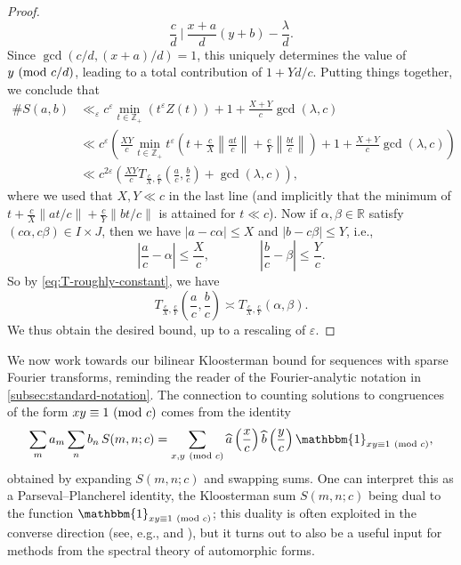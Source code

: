 \documentclass[reqno,11pt]{amsart}
\theoremstyle{remark}
\numberwithin{equation}{section}
\newcommand{\Z}{\mathbb{Z}}
\newcommand{\R}{\mathbb{R}}
\newcommand{\one}{\mathbbm{1}}
\newcommand{\eps}{\varepsilon}
\renewcommand{\hat}{\widehat}
\renewcommand{\pmod}[1]{\ (\textnormal{mod } #1)}
\begin{document}
\begin{proof}
\[
    \frac{c}{d}\ \bigg\vert \ \frac{x+a}{d} (y+b) - \frac{\lambda}{d}.
\]
Since $\gcd(c/d, (x+a)/d) = 1$, this uniquely determines the value of $y \pmod{c/d}$, leading to a total contribution of $1 + Yd/c$. Putting things together, we conclude that
\[
\begin{aligned}
    \# S(a, b) 
    &\ll_\eps 
    c^\eps \min_{t \in \Z_+} \left(t^\eps Z(t) \right) + 1 + \frac{X+Y}{c} \gcd(\lambda, c)
    \\
    &\ll
    c^\eps \left(\frac{XY}{c} \min_{t \in \Z_+} t^\eps \left(t + \frac{c}{X}\left\| \frac{at}{c}\right\| + \frac{c}{Y}\left\| \frac{bt}{c}\right\|\right) + 1 + \frac{X+Y}{c} \gcd(\lambda, c) \right)
    \\
    &\ll 
    c^{2\eps} \left(\frac{XY}{c} T_{\frac{c}{X},\frac{c}{Y}} \left(\frac{a}{c}, \frac{b}{c}\right) + \gcd(\lambda, c)\right),
\end{aligned}
\]
where we used that $X, Y \ll c$ in the last line (and implicitly that the minimum of $t + \frac{c}{X} \|at/c\| + \frac{c}{Y} \|bt/c\|$ is attained for $t \ll c$). Now if $\alpha, \beta \in \R$ satisfy $(c\alpha, c\beta) \in I \times J$, then we have $|a - c\alpha| \le X$ and $|b - c\beta| \le Y$, i.e.,
\[
    \left\vert\frac{a}{c} - \alpha \right\vert \le \frac{X}{c},
    \qquad\qquad
    \left\vert\frac{b}{c} - \beta \right\vert \le \frac{Y}{c}.
\]
So by \cref{eq:T-roughly-constant}, we have
\[
    T_{\frac{c}{X}, \frac{c}{Y}}\left(\frac{a}{c}, \frac{b}{c}\right)
    \asymp 
    T_{\frac{c}{X}, \frac{c}{Y}}(\alpha, \beta).
\]
We thus obtain the desired bound, up to a rescaling of $\eps$. 
\end{proof}

We now work towards our bilinear Kloosterman bound for sequences with sparse Fourier transforms, reminding the reader of the Fourier-analytic notation in \cref{subsec:standard-notation}. The connection to counting solutions to congruences of the form $xy \equiv 1 \pmod{c}$ comes from the identity 
\begin{equation} \label{eq:kloosterman-fourier}
    \sum_m a_m \sum_n b_n\, S(m, n; c) 
    = \sum_{x, y \pmod{c}} \hat{a}\left(\frac{x}{c}\right) \hat{b}\left(\frac{y}{c}\right) \one_{xy \equiv 1 \pmod{c}},
\end{equation}
obtained by expanding $S(m, n; c)$ and swapping sums. One can interpret this as a Parseval--Plancherel identity, the Kloosterman sum $S(m, n; c)$ being dual to the function $\one_{xy \equiv 1 \pmod{c}}$; this duality is often exploited in the converse direction (see, e.g., \cite[\S 7]{maynard2020primesII} and \cite{fouvry2015exponent}), but it turns out to also be a useful input for methods from the spectral theory of automorphic forms.
\end{document}
